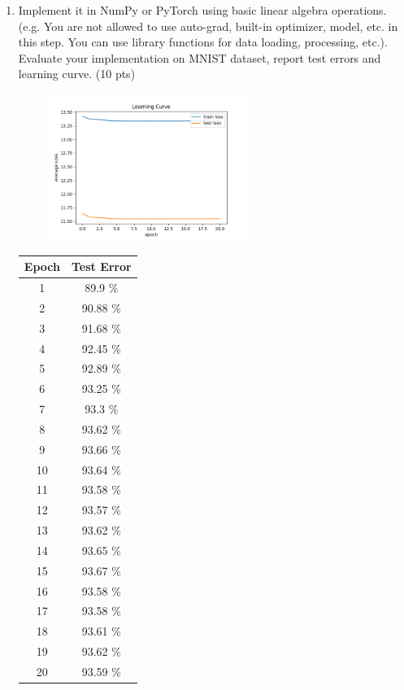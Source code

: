 \documentclass[a4paper]{article}
\theoremstyle{definition}
\newenvironment{soln}{
    \leavevmode\color{blue}\ignorespaces
}{}
\begin{document}
\begin{enumerate}
    \item Implement it in NumPy or PyTorch using basic linear algebra operations. (e.g. You are not allowed to use auto-grad, built-in optimizer, model, etc. in this step. You can use library functions for data loading, processing, etc.). Evaluate your implementation on MNIST dataset, report test errors and learning curve. (10 pts)
    
    \begin{soln}
        \begin{figure}[H]
			\centering
			\includegraphics[width=0.6\textwidth]{../figs/learning_curve.png}
		\end{figure}

        \begin{center}
            \begin{tabular}{c | c}
                Epoch & Test Error \\ \hline
                1 & 89.9 \% \\
                2 & 90.88 \% \\
                3 & 91.68 \% \\
                4 & 92.45 \% \\
                5 & 92.89 \% \\
                6 & 93.25 \% \\
                7 & 93.3 \% \\
                8 & 93.62 \% \\
                9 & 93.66 \% \\
                10 & 93.64 \% \\
                11 & 93.58 \% \\
                12 & 93.57 \% \\
                13 & 93.62 \% \\
                14 & 93.65 \% \\
                15 & 93.67 \% \\
                16 & 93.58 \% \\
                17 & 93.58 \% \\
                18 & 93.61 \% \\
                19 & 93.62 \% \\
                20 & 93.59 \% \\
            \end{tabular}
        \end{center}


\end{soln}
\end{enumerate}
\end{document}

